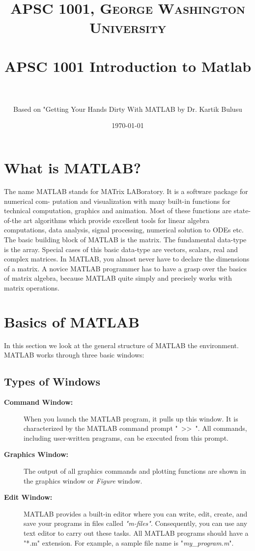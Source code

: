\documentclass[paper=a4, fontsize=11pt]{scrartcl} %
\title{	
\normalfont \normalsize 
\textsc{APSC 1001, George Washington University} \\ [25pt] %
\horrule{0.5pt} \\[0.4cm] %
\huge APSC 1001 Introduction to Matlab \\ %
\horrule{2pt} \\[0.5cm] %
}
\author{\normalsize Based on "Getting Your Hands Dirty With MATLAB by Dr. Kartik Bulusu } %
\date{\normalsize \today } %
\numberwithin{equation}{section} %
\numberwithin{figure}{section} %
\numberwithin{table}{section} %
\begin{document}
\maketitle %


\section{\textbf{What is MATLAB?}}

The name MATLAB stands for MATrix LABoratory. It is a software package for numerical com-
putation and visualization with many built-in functions for technical computation, graphics and
animation. Most of these functions are state-of-the art algorithms which provide excellent tools for
linear algebra computations, data analysis, signal processing, numerical solution to ODEs etc.\\

The basic building block of MATLAB is the matrix. The fundamental data-type is the array.
Special cases of this basic data-type are vectors, scalars, real and complex matrices. In MATLAB,
you almost never have to declare the dimensions of a matrix. A novice MATLAB programmer has
to have a grasp over the basics of matrix algebra, because MATLAB quite simply and precisely
works with matrix operations.


\section{\textbf{Basics of MATLAB}}

In this section we look at the general structure of MATLAB the environment. MATLAB works through three basic windows:

\subsection{Types of Windows}

\begin{description}
\item[\textbf{Command Window:}] When you launch the MATLAB program, it pulls up this window. It is characterized by the MATLAB command prompt "\ >>\ ". All commands, including user-written pragrams, can be executed from this prompt.

\item[\textbf{Graphics Window:}] The output of all graphics commands and plotting functions are shown in the graphics window or \textit{Figure} window.

\item[\textbf{Edit Window:}] MATLAB provides a built-in editor where you can write, edit, create, and save your programs in files called \textit{"m-files"}. 
Consequently, you can use any text editor to carry out these tasks. All MATLAB programs should have a "*.m" extension. 
For example, a sample file name is "\textit{my\_program.m}".

\end{description}
\end{document}
